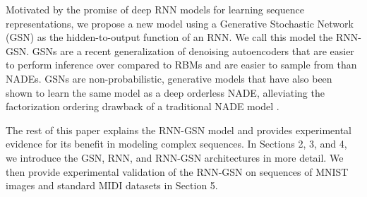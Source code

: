 Motivated by the promise of deep RNN models for learning sequence representations, we propose a new model using a Generative Stochastic Network (GSN) as the hidden-to-output function of an RNN. We call this model the RNN-GSN. GSNs are a recent generalization of denoising autoencoders \cite{gsn} that are easier to perform inference over compared to RBMs and are easier to sample from than NADEs. GSNs are non-probabilistic, generative models that have also been shown to learn the same model as a deep orderless NADE, alleviating the factorization ordering drawback of a traditional NADE model \cite{gsn_nade}.

The rest of this paper explains the RNN-GSN model and provides experimental evidence for its benefit in modeling complex sequences. In Sections 2, 3, and 4, we introduce the GSN, RNN, and RNN-GSN architectures in more detail. We then provide experimental validation of the RNN-GSN on sequences of MNIST images and standard MIDI datasets in Section 5.
